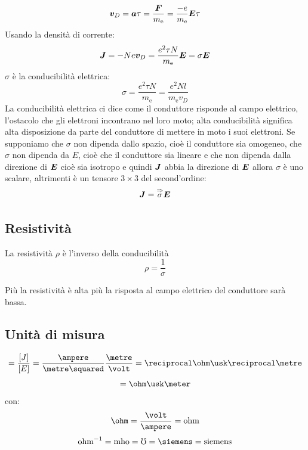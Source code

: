 \begin{equation*}\boldsymbol{v}_D=\boldsymbol{a}\tau=\frac{\boldsymbol{F}}{m_\mathrm{e}}=\frac{-e}{m_\mathrm{e}}{\boldsymbol{E}}\tau\end{equation*}
Usando la densità di corrente:
\begin{equation*}\boldsymbol{J}=-Ne\boldsymbol{v}_D=\frac{e^2\tau N}{m_\mathrm{e}}\boldsymbol{E}=\sigma\boldsymbol{E}\end{equation*}
$\sigma$ è la conducibilità elettrica:
\begin{equation*}\sigma=\frac{e^2\tau N}{m_\mathrm{e}}=\frac{e^2Nl}{m_\mathrm{e}v_D}\end{equation*}
La conducibilità elettrica ci dice come il conduttore risponde al campo elettrico, l'ostacolo che gli elettroni incontrano nel loro moto; alta conducibilità significa alta disposizione da parte del conduttore di mettere in moto i suoi elettroni. Se supponiamo che $\sigma$ non dipenda dallo spazio, cioè il conduttore sia omogeneo, che $\sigma$ non dipenda da $E$, cioè che il conduttore sia lineare e che non dipenda dalla direzione di $\boldsymbol{E}$ cioè sia isotropo e quindi $\boldsymbol{J}$ abbia la direzione di $\boldsymbol{E}$ allora $\sigma$ è uno scalare, altrimenti è un tensore $3\times 3$ del second'ordine:
\begin{equation*}\boldsymbol{J}=\overset{\Rightarrow}{\sigma}\boldsymbol{E}\end{equation*}
\subsection{Resistività }
\begin{Def}
La resistività $\rho$ è l'inverso della conducibilità 
\begin{equation*}\rho=\frac{1}{\sigma}\end{equation*}
\end{Def}
Più la resistività è alta più la risposta al campo elettrico del conduttore sarà bassa.
\subsection{Unità di misura}
\begin{equation*}[\sigma]=\frac{[J]}{[E]}=\frac{\ampere}{\metre\squared}\frac{\metre}{\volt}=\reciprocal\ohm\usk\reciprocal\metre\end{equation*}
\begin{equation*}[\rho]=\ohm\usk\meter\end{equation*}
con:
\begin{equation*}\ohm=\frac{\volt}{\ampere}=\text{ohm}\end{equation*}
\begin{equation*}\text{ohm}^{-1}=\text{mho}=\mho=\siemens=\text{siemens}\end{equation*}
